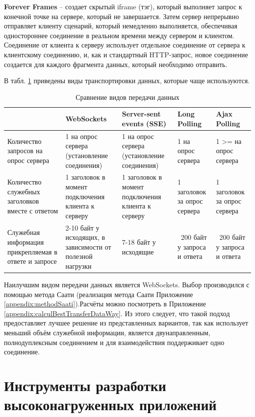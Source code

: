 \textbf{Forever Frames} – создает скрытый iframe (тэг), который выполняет запрос к конечной точке на сервере, который не завершается. Затем сервер непрерывно отправляет клиенту сценарий, который немедленно выполняется, обеспечивая одностороннее соединение в реальном времени между сервером и клиентом. Соединение от клиента к серверу использует отдельное соединение от сервера к клиентскому соединению, и, как и стандартный HTTP-запрос, новое соединение создается для каждого фрагмента данных, который необходимо отправить.

В табл. \ref{comparisonOfTypesOfDataTransmission} приведены виды транспортировки данных, которые чаще используются.

\begin{table}
	\caption{Сравнение видов передачи данных  \cite{WebSocke87:online,LongPoll65:online,Pollingv75:online}}
	\label{comparisonOfTypesOfDataTransmission}
	\begin{tabularx}{\linewidth}{|X|X|X|X|X|}
		\hline
		& WebSockets & Server-sent events (SSE) &	Long Polling &	Ajax Polling \\
		\hline
		Количество запросов  на опрос сервера &	1 на опрос сервера (установление соединения)	& 1 на опрос сервера (установление соединения)	& 1 на опрос сервера &	1 >= на опрос сервера \\
		\hline
		Количество служебных заголовков вместе с ответом &	1 заголовок в момент подключения клиента к серверу &	1 заголовок в момент подключения клиента к серверу &	1 заголовок за опрос сервера	& 1 заголовок за опрос сервера \\
		\hline
		Служебная информация прикрепляемая в ответе и запросе &	2-10 байт у исходящих, в зависимости от полезной нагрузки &	7-18 байт у исходящие &	~200 байт у запроса и ответа &	~200 байт у запроса и ответа \\
		\hline
	\end{tabularx}
\end{table}

Наилучшим видом передачи данных является WebSockets. Выбор производился с помощью метода Саати (реализация метода Саати Приложение \ref{appendix:methodSaati}).Расчёты можно посмотреть в Приложение \ref{appendix:calculBestTransferDataWay}. Из этого следует, что такой подход предоставляет лучшее решение из представленных вариантов, так как использует меньший объём служебной информации, является двунаправленным, полнодуплексным соединением и для взаимодействия поддерживает одно соединение.
	
\section{Инструменты разработки высоконагруженных приложений} \label{ch2:sec-abbr}
	
